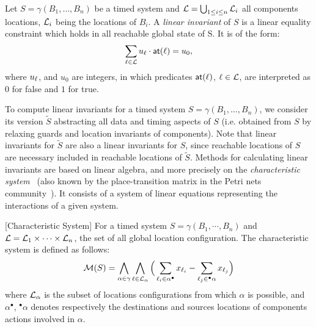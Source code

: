 \begin{definition}
\label{def:inv}
Let $S = \gamma(B_1,\dotsc,B_n)$ be a timed system and $\mathcal{L} = \bigcup_{1 \leq i \leq n} \mathcal{L}_i$
all components locations, $\mathcal{L}_i$ being  the locations of $B_i$.
A \emph{linear invariant} of $S$ is a linear equality constraint 
which holds in all reachable global state of S. It is of the form:
$$ \sum_{\ell \in\mathcal{L}}u_{\ell}\cdot \textsf{at}(\ell) = u_0, $$
where $u_{\ell}$, and $u_0$ are integers, in which predicates $\textsf{at}(\ell)$,
$\ell \in \mathcal{L}$, are interpreted as $0$ for false and $1$ for true.
\end{definition}

To compute linear invariants for a timed system $S = \gamma(B_1,\dotsc,B_n)$, we consider its 
version $\tilde{S}$ abstracting all data and timing aspects of $S$
(i.e. obtained from $S$ by relaxing guards and location invariants of components).
Note that linear invariants for $\tilde{S}$ are also a linear invariants for $S$, since 
reachable locations of $S$ are necessary included in reachable locations of $\tilde{S}$.
Methods for calculating linear invariants are based on linear algebra, and more precisely
on the \emph{characteristic system}~\cite{} (also known by the place-transition matrix in 
the Petri nets community~\cite{}). It consists of a system of linear equations representing 
the interactions of a given system.
\begin{definition}\label{def:chars}[Characteristic System]
  For a timed system $S=\gamma(B_1,\cdots,B_n)$ and $\mathcal{L}=\mathcal{L}_1\times\cdots\times\mathcal{L}_n$,
  the set of all global location configuration. The characteristic system is defined as 
  follows:
  $$\mathcal{M}(S)=\bigwedge_{\alpha\in\gamma}\bigwedge_{\ell\in\mathcal{L}_{\alpha}}
\Big(\sum_{\ell_i\in\alpha^{\bullet}}x_{\ell_i}-\sum_{\ell_j\in{^\bullet}\alpha}x_{\ell_j}\Big)$$
  where $\mathcal{L}_{\alpha}$ is the subset of locations configurations from which $\alpha$ is 
  possible, and $\alpha^{\bullet}$, ${^\bullet}\alpha$ denotes respectively the destinations and 
  sources locations of components actions involved in $\alpha$.
\end{definition}

